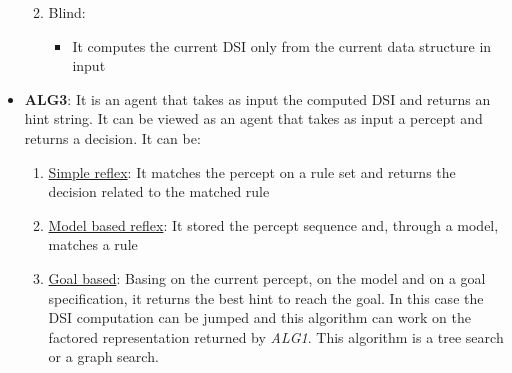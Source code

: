 \begin{itemize}
\begin{enumerate}
\begin{itemize}
		\end{itemize}
		\item Blind:
		\begin{itemize}
			\item It computes the current DSI only from the current data structure in input
		\end{itemize}
	\end{enumerate}
	\item \textbf{ALG3}: It is an agent that takes as input the computed DSI and returns an hint string. It can be viewed as an agent that takes as input a percept and returns a decision. It can be:
	\begin{enumerate}
		\item \underline{Simple reflex}: It matches the percept on a rule set and returns the decision related to the matched rule
		\item \underline{Model based reflex}: It stored the percept sequence and, through a model, matches a rule
		\item \underline{Goal based}: Basing on the current percept, on the model and on a goal specification, it returns the best hint to reach the goal. In this case the DSI computation can be jumped and this algorithm can work on the factored representation returned by \textit{ALG1}. This algorithm is a tree search or a graph search.
	\end{enumerate}
\end{itemize}
